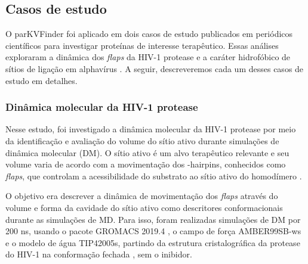\documentclass[Portugues]{phdquali}
\begin{document}


\subsection{Casos de estudo}

O parKVFinder foi aplicado em dois casos de estudo publicados em periódicos científicos para investigar proteínas de interesse terapêutico. Essas análises exploraram a dinâmica dos \textit{flaps} da HIV-1 protease \cite{guerra2020} e a caráter hidrofóbico de sítios de ligação em alphavírus \cite{ribeiro2021}. A seguir, descreveremos cada um desses casos de estudo em detalhes.

\subsubsection{Dinâmica molecular da HIV-1 protease}

Nesse estudo, foi investigado a dinâmica molecular da HIV-1 protease por meio da identificação e avaliação do volume do sítio ativo durante simulações de dinâmica molecular (DM). O sítio ativo é um alvo terapêutico relevante e seu volume varia de acordo com a movimentação dos \textbeta-hairpins, conhecidos como \textit{flaps}, que controlam a acessibilidade do substrato ao sítio ativo do homodímero \cite{soares2016}. %

O objetivo era descrever a dinâmica de movimentação dos \textit{flaps} através do volume e forma da cavidade do sítio ativo como descritores conformacionais durante as simulações de MD. Para isso, foram realizadas simulações de DM por 200 ns, usando o pacote GROMACS 2019.4 \cite{gromacs}, o campo de força AMBER99SB-ws e o modelo de água TIP42005s, partindo da estrutura cristalográfica da protease do HIV-1 na conformação fechada \cite{lam1994}, sem o inibidor.
\end{document}
